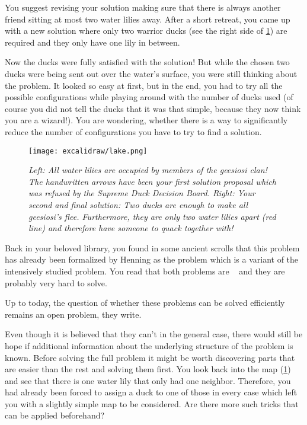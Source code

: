 You suggest revising your solution making sure that there is always another friend sitting at most two water lilies away. After a short retreat, you came up with a new solution where only two warrior ducks (see the right side of \cref{fig:duck-lake}) are required and they only have one lily in between. 

Now the ducks were fully satisfied with the solution! But while the chosen two ducks were being sent out over the water's surface, you were still thinking about the problem.
It looked so easy at first, but in the end, you had to try all the possible configurations while playing around with the number of ducks used (of course you did not tell the ducks that it was that simple, because they now think you are a wizard!). 
You are wondering, whether there is a way to significantly reduce the number of configurations you have to try to find a solution.

\begin{figure}[t]
    \centering
    \texttt{[image: excalidraw/lake.png]}
    \caption[Introductions: Merganser Lake. Own Drawing. Embedded icons under public domain from {\href{https://creazilla.com/}{https://creazilla.com/}}]{\textit{Left: All water lilies are occupied by members of the \textit{geesiosi} clan! The handwritten arrows have been your first solution proposal which was refused by the \textit{Supreme Duck Decision Board}.
    Right: Your second and final solution: Two ducks are enough to make all \textit{geesiosi}'s flee. Furthermore, they are only two water lilies apart (red line) and therefore have someone to quack together with!}}
    \label{fig:duck-lake}
\end{figure}


Back in your beloved library, you found in some ancient scrolls that this problem has already been formalized by Henning \cite{Henning2019} as the \sdom problem which is a variant of the intensively studied \dom problem. 
You read that both problems are \NPc~\cite{Garey1979,Henning2019} and they are probably very hard to solve.

Up to today, the question of whether these \NPc problems can be solved efficiently remains an open problem, they write. 

Even though it is believed that they can't in the general case, there would still be hope if additional information about the underlying structure of the problem is known. 
Before solving the full problem it might be worth discovering parts that are easier than the rest and solving them first. You look back into the map (\cref{fig:duck-lake}) and see that there is one water lily that only had one neighbor.
Therefore, you had already been forced to assign a duck to one of those in every case which left you with a slightly simple map to be considered. Are there more such tricks that can be applied beforehand?

